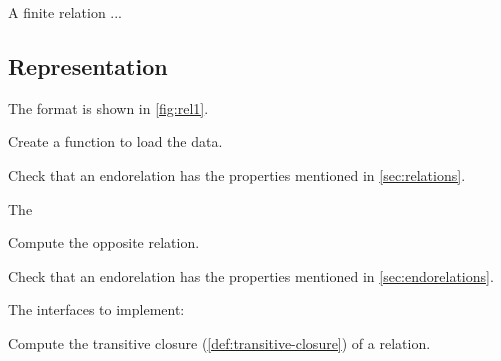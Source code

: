 A finite relation  ...


\subsection*{Representation}

The format is shown in \cref{fig:rel1}.


\begin{exercise}
  Create a function to load the data.


%

\end{exercise}


%  

\begin{exercise}

  Check that an endorelation has the properties mentioned in \cref{sec:relations}.

  The

\end{exercise}




\begin{exercise}[Opposite]
  Compute the opposite relation.


\end{exercise}

\begin{exercise}

  Check that an endorelation has the properties mentioned in \cref{sec:endorelations}.

  The interfaces to implement:

\end{exercise}

\begin{exercise}
  Compute the transitive closure (\cref{def:transitive-closure}) of a relation.


\end{exercise}


